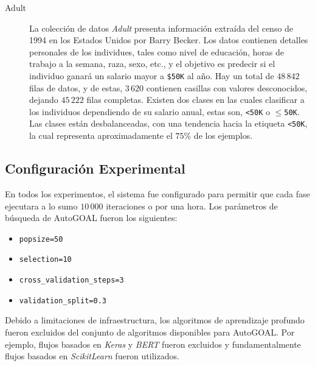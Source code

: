 \begin{description}
\item[Adult]
La colección de datos \emph{Adult} \parencite{ucidata} presenta información extraída del censo de 1994 en los Estados Unidos por Barry Becker.
Los datos contienen detalles personales de los individues, tales como nivel de educación, horas de trabajo a la semana, raza, sexo, etc., y el objetivo es predecir si el individuo ganará un salario mayor a \texttt{\$50K} al año.
Hay un total de $48\,842$ filas de datos, y de estas, $3\,620$ contienen casillas con valores desconocidos, dejando $45\,222$ filas completas.
Existen dos clases en las cuales clasificar a los individuos dependiendo de su salario anual, estas son, \texttt{<50K} o \texttt{$\leq$50K}.
Las clases están desbalanceadas, con una tendencia hacia la etiqueta \texttt{<50K}, la cual representa aproximadamente el $75\%$ de los ejemplos.

\end{description}

\subsection{Configuración Experimental}\label{section:experimental-setup}

En todos los experimentos, el sistema fue configurado para permitir que cada fase ejecutara a lo sumo $10\,000$ iteraciones o por una hora.
Los parámetros de búsqueda de AutoGOAL fueron los siguientes:
\begin{itemize}
    \item \texttt{popsize=50}
    \item \texttt{selection=10}
    \item \texttt{cross\_validation\_steps=3}
    \item \texttt{validation\_split=0.3}
\end{itemize}

Debido a limitaciones de infraestructura, los algoritmos de aprendizaje profundo fueron excluidos del conjunto de algoritmos disponibles para AutoGOAL.
Por ejemplo, flujos basados en \emph{Keras} y \emph{BERT} fueron excluidos y fundamentalmente flujos basados en \emph{ScikitLearn} fueron utilizados.

